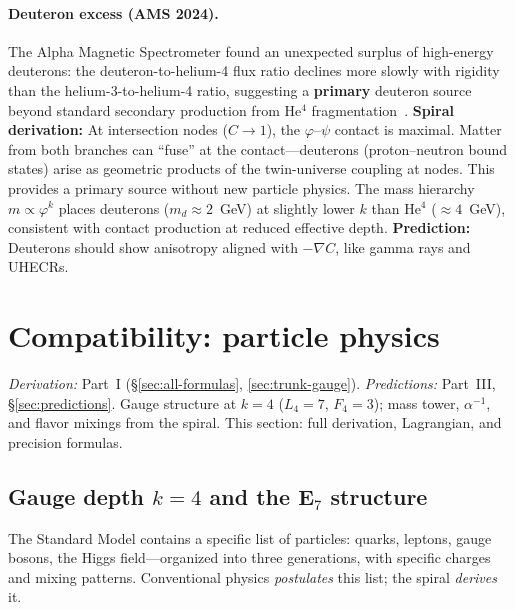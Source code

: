\documentclass[12pt,a4paper]{article}
\begin{document}
\paragraph{Deuteron excess (AMS 2024).}
The Alpha Magnetic Spectrometer found an unexpected surplus of high-energy deuterons: the deuteron-to-helium-4 flux ratio declines more slowly with rigidity than the helium-3-to-helium-4 ratio, suggesting a \textbf{primary} deuteron source beyond standard secondary production from He${}^4$ fragmentation~\cite{AMS2024}. \textbf{Spiral derivation:} At intersection nodes ($C \to 1$), the $\varphi$--$\psi$ contact is maximal. Matter from both branches can ``fuse'' at the contact---deuterons (proton--neutron bound states) arise as geometric products of the twin-universe coupling at nodes. This provides a primary source without new particle physics. The mass hierarchy $m \propto \varphi^k$ places deuterons ($m_d \approx 2$~GeV) at slightly lower $k$ than He${}^4$ ($\approx 4$~GeV), consistent with contact production at reduced effective depth. \textbf{Prediction:} Deuterons should show anisotropy aligned with $-\nabla C$, like gamma rays and UHECRs.




\section{Compatibility: particle physics}
\label{sec:particle-physics-domain}

\noindent\textit{Derivation:} Part~I (\S\ref{sec:all-formulas}, \ref{sec:trunk-gauge}). \textit{Predictions:} Part~III, \S\ref{sec:predictions}. Gauge structure at $k=4$ ($L_4=7$, $F_4=3$); mass tower, $\alpha^{-1}$, and flavor mixings from the spiral. This section: full derivation, Lagrangian, and precision formulas.

\subsection{Gauge depth $k=4$ and the E$_7$ structure}
\label{sec:gauge-k4-e7}

The Standard Model contains a specific list of particles: quarks, leptons, gauge bosons, the Higgs field---organized into three generations, with specific charges and mixing patterns.  Conventional physics \emph{postulates} this list; the spiral \emph{derives} it.
\end{document}
